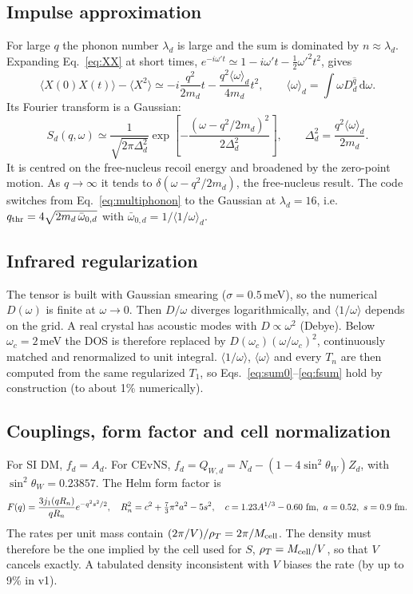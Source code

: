 \documentclass[11pt,a4paper]{article}
\numberwithin{equation}{section}
\newcommand{\qh}{\hat q}
\newcommand{\dd}{\mathrm{d}}
\newcommand{\avg}[1]{\langle #1\rangle}
\begin{document}
\subsection{Impulse approximation}
For large $q$ the phonon number $\lambda_d$ is large and the sum is dominated by
$n\approx\lambda_d$. Expanding Eq.~\eqref{eq:XX} at short times,
$e^{-i\omega't}\simeq1-i\omega't-\frac12\omega'^2t^2$, gives
\begin{equation}
  \avg{X(0)X(t)}-\avg{X^2}\simeq -i\frac{q^2}{2m_d}t-\frac{q^2\avg{\omega}_d}{4m_d}t^2,
  \qquad \avg\omega_d=\int\omega D_d^{\qh}\,\dd\omega .
\end{equation}
Its Fourier transform is a Gaussian:
\begin{equation}
  S_d(q,\omega)\simeq\frac{1}{\sqrt{2\pi\Delta_d^2}}\exp\!\left[-\frac{(\omega-q^2/2m_d)^2}{2\Delta_d^2}\right],
  \qquad \Delta_d^2=\frac{q^2\avg{\omega}_d}{2m_d}.
\end{equation}
It is centred on the free-nucleus recoil energy and broadened by the zero-point motion. As
$q\to\infty$ it tends to $\delta(\omega-q^2/2m_d)$, the free-nucleus result. The code
switches from Eq.~\eqref{eq:multiphonon} to the Gaussian at $\lambda_d=16$, i.e.\
$q_{\rm thr}=4\sqrt{2m_d\,\bar\omega_{0,d}}$ with $\bar\omega_{0,d}=1/\avg{1/\omega}_d$.

\subsection{Infrared regularization}
The tensor is built with Gaussian smearing ($\sigma=0.5$\,meV), so the numerical $D(\omega)$
is finite at $\omega\to0$. Then $D/\omega$ diverges logarithmically, and $\avg{1/\omega}$
depends on the grid. A real crystal has acoustic modes with $D\propto\omega^2$ (Debye).
Below $\omega_c=2$\,meV the DOS is therefore replaced by
$D(\omega_c)(\omega/\omega_c)^2$, continuously matched and renormalized to unit integral.
$\avg{1/\omega}$, $\avg{\omega}$ and every $T_n$ are then computed from the same regularized
$T_1$, so Eqs.~\eqref{eq:sum0}--\eqref{eq:fsum} hold by construction (to about 1\%
numerically).

\subsection{Couplings, form factor and cell normalization}
For SI DM, $f_d=A_d$. For CEvNS, $f_d=Q_{W,d}=N_d-(1-4\sin^2\theta_W)Z_d$, with
$\sin^2\theta_W=0.23857$. The Helm form factor is
\begin{equation}
  F(q)=\frac{3j_1(qR_n)}{qR_n}e^{-q^2s^2/2},\quad
  R_n^2=c^2+\tfrac73\pi^2a^2-5s^2,\quad c=1.23A^{1/3}-0.60\ {\rm fm},\ a=0.52,\ s=0.9\ {\rm fm}.
\end{equation}
The rates per unit mass contain $(2\pi/V)/\rho_T=2\pi/M_{\rm cell}$. The density must therefore
be the one implied by the cell used for $S$, $\rho_T=M_{\rm cell}/V$, so that $V$ cancels
exactly. A tabulated density inconsistent with $V$ biases the rate (by up to 9\% in v1).
\end{document}
